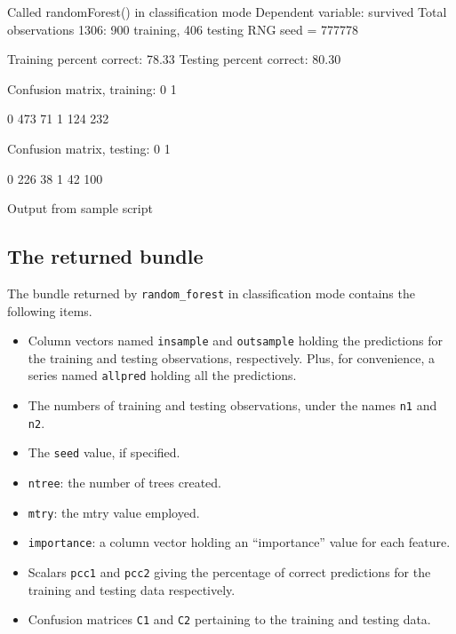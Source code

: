 \documentclass{article}
\begin{document}
\begin{script}[htbp]
  \begin{scodebit}
Called randomForest() in classification mode
Dependent variable: survived
Total observations 1306: 900 training, 406 testing
RNG seed = 777778

Training percent correct: 78.33
Testing percent correct:  80.30

Confusion matrix, training:
             0            1

0          473           71
1          124          232

Confusion matrix, testing:
             0            1

0          226           38
1           42          100
\end{scodebit}
  \caption{Output from sample script}
  \label{output}
\end{script}

\subsection{The returned bundle}

The bundle returned by \texttt{random\_forest} in classification mode
contains the following items.
\begin{itemize}
\item Column vectors named \texttt{insample} and \texttt{outsample}
  holding the predictions for the training and testing observations,
  respectively. Plus, for convenience, a series named \texttt{allpred}
  holding all the predictions.
\item The numbers of training and testing observations, under the
  names \texttt{n1} and \texttt{n2}.
\item The \texttt{seed} value, if specified.
\item \texttt{ntree}: the number of trees created.
\item \texttt{mtry}: the mtry value employed.
\item \texttt{importance}: a column vector holding an ``importance''
  value for each feature.
\item Scalars \texttt{pcc1} and \texttt{pcc2} giving the percentage of
  correct predictions for the training and testing data respectively.
\item Confusion matrices \texttt{C1} and \texttt{C2} pertaining to the
  training and testing data.
\end{itemize}
\end{document}
